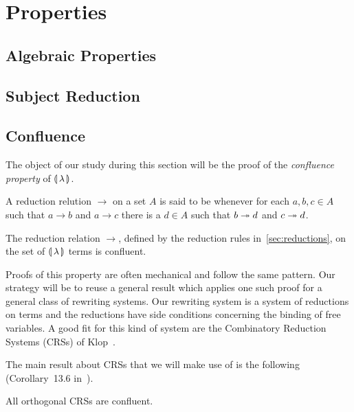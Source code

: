 \chapter{Properties}
\label{chap:properties}


\section{Algebraic Properties}
\label{sec:algebraic-properties}


\section{Subject Reduction}


\section{Confluence}
\label{sec:confluence}

The object of our study during this section will be the proof of the
\emph{confluence property} of $\llparenthesis \, \lambda \, \rrparenthesis$.

\begin{definition}
  A reduction relution $\to$ on a set $A$ is said to be 
  whenever for each $a,b,c \in A$ such that $a \to b$ and $a \to c$ there
  is a $d \in A$ such that $b \twoheadrightarrow d$ and $c \twoheadrightarrow d$.
\end{definition}

\begin{theorem}\label{thm:confluence}
  
  The reduction relation $\to$, defined by the reduction rules
  in~\ref{sec:reductions}, on the set of $\llparenthesis \, \lambda \, \rrparenthesis$ terms is
  confluent.
\end{theorem}

Proofs of this property are often mechanical and follow the same
pattern. Our strategy will be to reuse a general result which applies one
such proof for a general class of rewriting systems. Our rewriting system
is a system of reductions on terms and the reductions have side conditions
concerning the binding of free variables. A good fit for this kind of
system are the Combinatory Reduction Systems (CRSs) of
Klop~\cite{klop1993combinatory}.

The main result about CRSs that we will make use of is the following
(Corollary~13.6 in~\cite{klop1993combinatory}).

\begin{theorem}\label{thm:confluence-crs}

  All orthogonal CRSs are confluent.
\end{theorem}

